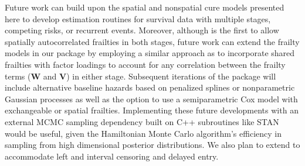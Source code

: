 Future work can build upon the spatial and nonspatial cure models presented here to develop estimation routines for survival data with multiple stages, competing risks, or recurrent events. Moreover, although   is the first to allow spatially autocorrelated frailties in both stages, future work can extend the frailty models in our package by employing a similar approach as \citet{yin} to incorporate shared frailties with factor loadings to account for any correlation between the frailty terms ($\textbf{W}$ and $\textbf{V}$) in either stage. Subsequent iterations of the package will include alternative baseline hazards based on penalized splines or nonparametric Gaussian processes as well as the option to use a semiparametric Cox model with exchangeable or spatial frailties. Implementing these future developments with an external MCMC sampling dependency built on C++ subroutines like STAN would be useful, given the Hamiltonian Monte Carlo algorithm's efficiency in sampling from high dimensional posterior distributions. We also plan to extend  to accommodate left and interval censoring and delayed entry. 



\address{Brandon Bolte\\
Department of Political Science\\
Penn State University\\
USA\\
}

\address{Nicol\'as Schmidt\\
Department of Political Science\\
Universidad de la Rep\'ublica\\
Uruguay\\
}

\address{Sergio B\'ejar\\
Department of Political Science\\
San Jos\'e State University\\
USA\\
}

\address{Nguyen Huynh\\
Department of Political Science\\
Penn State University\\
USA\\
}

\address{Bumba Mukherjee\\
Department of Political Science\\
Penn State University\\
USA\\
}


